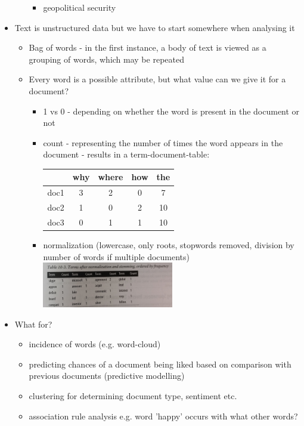 \begin{itemize}
\begin{itemize}
\begin{itemize}
    \item geopolitical security
    \end{itemize}      
  \end{itemize}
\item Text is unstructured data but we have to start somewhere when analysing it
  \begin{itemize}
  \item Bag of words - in the first instance, a body of text is viewed as a grouping of words, which may be repeated
  \item Every word is a possible attribute, but what value can we give it for a document?
    \begin{itemize}
    \item 1 vs 0 - depending on whether the word is present in the document or not
    \item count - representing the number of times the word appears in the document - results in a term-document-table:\\
      \begin{tabular}{ccccc}
        & why & where & how & the \\
        \hline
        doc1 & 3 & 2 &0 & 7 \\ 
        doc2 & 1 & 0 &2 & 10 \\ 
        doc3 & 0 & 1 &1 & 10 \\ 
      \end{tabular}
    \item normalization (lowercase, only roots, stopwords removed, division by number of words if multiple documents)\\
      \includegraphics[width=0.5\textwidth]{norm_tdt.jpg}
    \end{itemize}
  \end{itemize}
\item What for?
  \begin{itemize}
  \item incidence of words (e.g. word-cloud)
  \item predicting chances of a document being liked based on comparison with previous documents (predictive modelling)
  \item clustering for determining document type, sentiment etc.
    \item association rule analysis e.g. word 'happy' occurs with what other words?
  \end{itemize}
\end{itemize}

